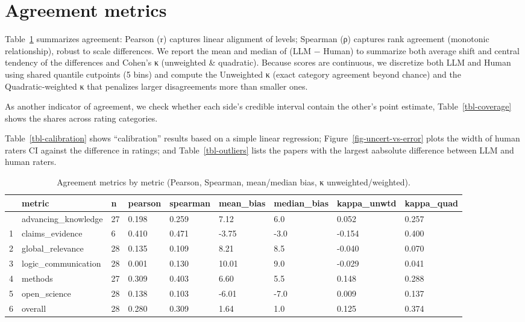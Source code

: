 \documentclass[
  11pt,
  letterpaper,
  DIV=11,
  numbers=noendperiod]{scrreprt}
\begin{document}
\section{Agreement metrics}\label{agreement-metrics}

Table~\ref{tbl-agreement} summarizes agreement: Pearson (r) captures
linear alignment of levels; Spearman (ρ) captures rank agreement
(monotonic relationship), robust to scale differences. We report the
mean and median of (LLM − Human) to summarize both average shift and
central tendency of the differences and Cohen's κ (unweighted \&
quadratic). Because scores are continuous, we discretize both LLM and
Human using shared quantile cutpoints (5 bins) and compute the
Unweighted κ (exact category agreement beyond chance) and the
Quadratic‑weighted κ that penalizes larger disagreements more than
smaller ones.

As another indicator of agreement, we check whether each side's credible
interval contain the other's point estimate, Table~\ref{tbl-coverage}
shows the shares across rating categories.

Table~\ref{tbl-calibration} shows ``calibration'' results based on a
simple linear regression; Figure~\ref{fig-uncert-vs-error} plots the
width of human raters CI against the difference in ratings; and
Table~\ref{tbl-outliers} lists the papers with the largest aabsolute
difference between LLM and human raters.

\begin{longtable}[]{@{}lllllllll@{}}

\caption{\label{tbl-agreement}Agreement metrics by metric (Pearson,
Spearman, mean/median bias, κ unweighted/weighted).}

\tabularnewline

\toprule\noalign{}
& metric & n & pearson & spearman & mean\_bias & median\_bias &
kappa\_unwtd & kappa\_quad \\
\midrule\noalign{}
\endhead
\bottomrule\noalign{}
\endlastfoot
0 & advancing\_knowledge & 27 & 0.198 & 0.259 & 7.12 & 6.0 & 0.052 &
0.257 \\
1 & claims\_evidence & 6 & 0.410 & 0.471 & -3.75 & -3.0 & -0.154 &
0.400 \\
2 & global\_relevance & 28 & 0.135 & 0.109 & 8.21 & 8.5 & -0.040 &
0.070 \\
3 & logic\_communication & 28 & 0.001 & 0.130 & 10.01 & 9.0 & -0.029 &
0.041 \\
4 & methods & 27 & 0.309 & 0.403 & 6.60 & 5.5 & 0.148 & 0.288 \\
5 & open\_science & 28 & 0.138 & 0.103 & -6.01 & -7.0 & 0.009 & 0.137 \\
6 & overall & 28 & 0.280 & 0.309 & 1.64 & 1.0 & 0.125 & 0.374 \\

\end{longtable}
\end{document}
